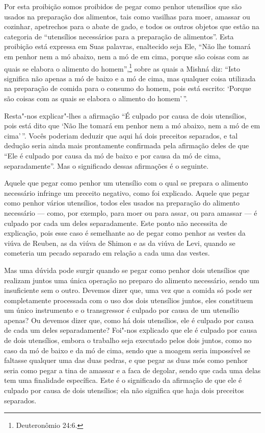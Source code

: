 \begin{multicols}{2}
Por esta proibição somos proibidos de pegar como penhor utensílios que
são usados na preparação dos alimentos, tais como vasilhas para moer,
amassar ou cozinhar, apetrechos para o abate de gado, e todos os outros
objetos que estão na categoria de ``utensílios necessários para a
preparação de alimentos''. Esta proibição está expressa em Suas
palavras, enaltecido seja Ele, ``Não lhe tomará em penhor nem a mó
abaixo, nem a mó de em cima, porque são coisas com as quais se elabora o
alimento do homem'',\footnote{Deuteronômio 24:6.} sobre as quais a Mishná\starr{} diz:
``Isto significa não apenas a mó de baixo e a mó de cima, mas qualquer
coisa utilizada na preparação de comida para o consumo do homem, pois
está escrito: `Porque são coisas com as quais se elabora o alimento do
homem'\,''.

Resta"-nos explicar"-lhes a afirmação ``É culpado por causa de dois
utensílios, pois está dito que `Não lhe tomará em penhor nem a mó
abaixo, nem a mó de em cima'\,''. Vocês poderiam deduzir que aqui há dois
preceitos separados, e tal dedução seria ainda mais prontamente
confirmada pela afirmação deles de que ``Ele é culpado por causa da mó
de baixo e por causa da mó de cima, separadamente''. Mas o significado
dessas afirmações é o seguinte.

Aquele que pegar como penhor um utensílio com o qual se prepara o
alimento necessário infringe um preceito negativo, como foi explicado.
Aquele que pegar como penhor vários utensílios, todos eles usados na
preparação do alimento necessário --- como, por exemplo, para moer ou
para assar, ou para amassar --- é culpado por cada um deles
separadamente. Este ponto não necessita de explicação, pois esse caso é
semelhante ao de pegar como penhor as vestes da viúva de Reuben, as da
viúva de Shimon e as da viúva de Levi\starr, quando se cometeria um pecado
separado em relação a cada uma das vestes.

Mas uma dúvida pode surgir quando se pegar como penhor dois utensílios
que realizam juntos uma única operação no preparo do alimento
necessário, sendo um insuficiente sem o outro. Devemos dizer que, uma
vez que a comida só pode ser completamente processada com o uso dos
dois utensílios juntos, eles constituem um único instrumento e o
transgressor é culpado por causa de um utensílio apenas? Ou devemos
dizer que, como há dois utensílios, ele é culpado por causa de cada um
deles separadamente? Foi"-nos explicado que ele é culpado por causa de
dois utensílios, embora o trabalho seja executado pelos dois juntos,
como no caso da mó de baixo e da mó de cima, sendo que a moagem seria
impossível se faltasse qualquer uma das duas pedras, e que pegar as
duas mós como penhor seria como pegar a tina de amassar e a faca de
degolar, sendo que cada uma delas tem uma finalidade específica. Este é
o significado da afirmação de que ele é culpado por causa de dois
utensílios; ela não significa que haja dois preceitos separados.


\end{multicols}
